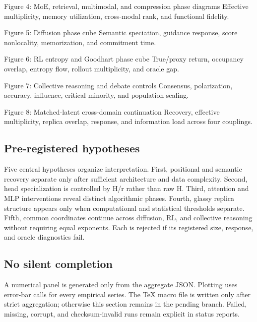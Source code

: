 {Figure 4: MoE, retrieval, multimodal, and compression phase diagrams}
{Effective multiplicity, memory utilization, cross-modal rank, and functional fidelity.}

{Figure 5: Diffusion phase cube}
{Semantic speciation, guidance response, score nonlocality, memorization, and commitment time.}

{Figure 6: RL entropy and Goodhart phase cube}
{True/proxy return, occupancy overlap, entropy flow, rollout multiplicity, and oracle gap.}

{Figure 7: Collective reasoning and debate controls}
{Consensus, polarization, accuracy, influence, critical minority, and population scaling.}

{Figure 8: Matched-latent cross-domain continuation}
{Recovery, effective multiplicity, replica overlap, response, and information load across four couplings.}

\subsection{Pre-registered hypotheses}

Five central hypotheses organize interpretation. First, positional and semantic recovery
separate only after sufficient architecture and data complexity. Second, head
specialization is controlled by H/r rather than raw H. Third, attention and MLP
interventions reveal distinct algorithmic phases. Fourth, glassy replica structure appears
only when computational and statistical thresholds separate. Fifth, common coordinates
continue across diffusion, RL, and collective reasoning without requiring equal exponents.
Each is rejected if its registered size, response, and oracle diagnostics fail.

\subsection{No silent completion}

A numerical panel is generated only from the aggregate JSON. Plotting uses error-bar calls
for every empirical series. The TeX macro file is written only after strict aggregation;
otherwise this section remains in the pending branch. Failed, missing, corrupt, and
checksum-invalid runs remain explicit in status reports.
